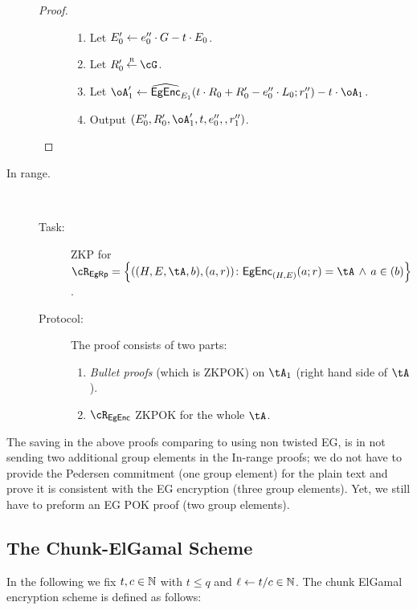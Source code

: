 \begin{description}
\begin{proof}
\begin{description}
\begin{enumerate}
			
			
			\item Let $E_0' \leftarrow e''_0\cdot G- t\cdot E_0$.
			
			\item Let $R_0' \getsr \cG$.
			
			\item Let $ \oA_1' \asn \wEgEnc_{E_1}(t\cdot R_0 + R_0' - e''_0 \cdot L_0;r_1'') - t\cdot \oA_1$.
			
			\item  Output $(E'_0,R_0',\oA_1',t,e''_0,,r''_1)$. 
			
		\end{enumerate}		
	\end{description}
	\end{proof}
	\item[In range.] ~
	\begin{description}
		\item[Task:] ZKP for $\rEgRp =\rEgRpDef$.
		
		\item[Protocol:]  The proof consists of two parts:
		\begin{enumerate}
			\item  \textit{Bullet proofs} \cite{SP:BBBPWM18}  (which is  ZKPOK) on $\tA_1$ (\ie right hand side of $\tA$).   
			
			
			
			\item   $\rEgEnc$ ZKPOK  for the whole $\tA$.
		\end{enumerate}
		
	\end{description}
\end{description}

\begin{remark}[Efficiency]
	The saving in the above proofs comparing to using non twisted EG, is in not sending two additional   group elements in the In-range proofs;  we do not have to provide the Pedersen commitment (one group element)  for the plain text and prove it is consistent with the EG encryption (three group elements). Yet, we still have to preform an EG POK proof (two group elements).
\end{remark}	

	
\subsection{The Chunk-ElGamal  Scheme}\label{sec:ChanksEg:EgScheme}
In the following we fix $t,c\in {\mathbb{N}}$ with $t\le q$ and $\ell \leftarrow t/c \in {\mathbb{N}}$. The chunk ElGamal encryption scheme  is defined as follows:



